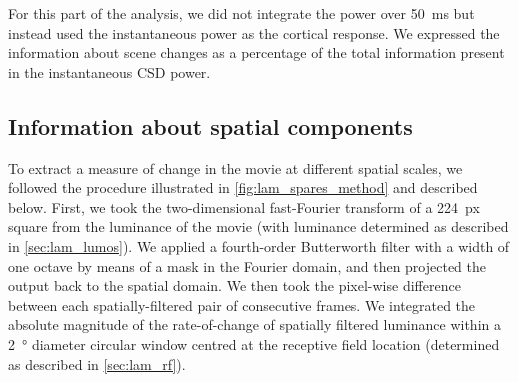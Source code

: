 For this part of the analysis, we did not integrate the power over \SI{50}{\milli\second} but instead used the instantaneous power as the cortical response.
We expressed the information about scene changes as a percentage of the total information present in the instantaneous \ac{CSD} power.


\subsection{Information about spatial components}
\label{sec:lam_spares_method}

To extract a measure of change in the movie at different spatial scales, we followed the procedure illustrated in \autoref{fig:lam_spares_method} and described below.
First, we took the two-dimensional fast-Fourier transform of a \SI{224}{px} square from the luminance of the movie (with luminance determined as described in \autoref{sec:lam_lumos}).
We applied a fourth-order Butterworth filter with a width of one octave by means of a mask in the Fourier domain, and then projected the output back to the spatial domain.
We then took the pixel-wise difference between each spatially-filtered pair of consecutive frames.
We integrated the absolute magnitude of the rate-of-change of spatially filtered luminance within a \SI{2}{\degree} diameter circular window centred at the receptive field location (determined as described in \autoref{sec:lam_rf}).


